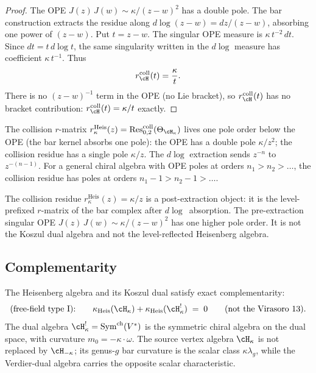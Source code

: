 \begin{proof}
The OPE $J(z)\,J(w) \sim \kappa/(z{-}w)^2$ has a double pole.
The bar construction extracts the residue along
$d\log(z{-}w) = dz/(z{-}w)$, absorbing one power of
$(z{-}w)$.
Put $t=z-w$. The singular OPE measure is
$\kappa\,t^{-2}\,dt$. Since $dt=t\,d\log t$, the same singularity
written in the $d\log$ measure has coefficient
$\kappa\,t^{-1}$. Thus
\[
r^{\mathrm{coll}}_{\cH}(t)=\frac{\kappa}{t}.
\]
There is no $(z{-}w)^{-1}$ term in the OPE (no Lie bracket), so
$r^{\mathrm{coll}}_{\cH}(t)$ has no bracket contribution:
$r^{\mathrm{coll}}_{\cH}(t)=\kappa/t$ exactly.
\end{proof}

\begin{remark}
\label{rem:heisenberg-bar-absorbs-pole}
The collision $r$-matrix
$r^{\mathrm{Heis}}_\kappa(z)
= \operatorname{Res}^{\mathrm{coll}}_{0,2}(\Theta_{\cH_\kappa})$
lives one pole order below the OPE
(the bar kernel absorbs one pole): the OPE has a
double pole $\kappa/z^2$; the collision residue has a single pole
$\kappa/z$. The $d\log$ extraction sends $z^{-n}$ to
$z^{-(n-1)}$. For a general chiral algebra with OPE
poles at orders $n_1 > n_2 > \ldots$, the collision residue has
poles at orders $n_1-1 > n_2-1 > \ldots$.

The collision residue
$r^{\mathrm{Heis}}_\kappa(z)=\kappa/z$ is a post-extraction object:
it is the level-prefixed $r$-matrix of the bar complex after
$d\log$~absorption.
The pre-extraction singular OPE
$J(z)\,J(w) \sim \kappa/(z{-}w)^2$ has one higher pole order.
It is not the Koszul dual algebra and not the level-reflected
Heisenberg algebra.
\end{remark}

\subsection{Complementarity}
\label{subsec:heisenberg-complementarity}

\begin{proposition}
\label{prop:heisenberg-complementarity}
The Heisenberg algebra and its Koszul dual satisfy exact
complementarity:
\begin{equation}\label{eq:heisenberg-complementarity}
\text{(free-field type~I):}\qquad \kappa_{\mathrm{Heis}}(\cH_\kappa) + \kappa_{\mathrm{Heis}}(\cH_\kappa^!) \;=\; 0 \qquad \text{(not the Virasoro $13$).}
\end{equation}
The dual algebra $\cH_\kappa^! =
\operatorname{Sym}^{\mathrm{ch}}(V^*)$ is the symmetric chiral
algebra on the dual space, with curvature
$m_0=-\kappa\cdot\omega$. The source vertex algebra
$\cH_\kappa$ is not replaced by $\cH_{-\kappa}$; its genus-$g$
bar curvature is the scalar class $\kappa\lambda_g$, while the
Verdier-dual algebra carries the opposite scalar characteristic.
\end{proposition}

